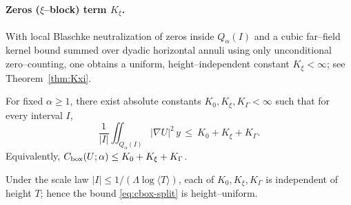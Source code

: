 \paragraph{Zeros ($\xi$–block) term $K_\xi$.}
With local Blaschke neutralization of zeros inside $Q_\alpha(I)$ and a cubic far–field kernel bound summed over dyadic horizontal annuli using only unconditional zero–counting, one obtains a uniform, height–independent constant $K_\xi<\infty$; see Theorem~\ref{thm:Kxi}.

\begin{theorem}\label{thm:aggregation-box}
For fixed $\alpha\ge1$, there exist absolute constants $K_0,K_\xi,K_\Gamma<\infty$ such that for every interval $I$,
\[\frac{1}{|I|}\iint_{Q_\alpha(I)} |\nabla U|^2\,y\,\le\ K_0+K_\xi+K_\Gamma.\]
Equivalently, $C_{\rm box}(U;\alpha)\le K_0+K_\xi+K_\Gamma$.
\end{theorem}

\begin{remark}
Under the scale law $|I|\le 1/(\Lambda\log\langle T\rangle)$, each of $K_0,K_\xi,K_\Gamma$ is independent of height $T$; hence the bound \eqref{eq:cbox-split} is height–uniform.
\end{remark}
